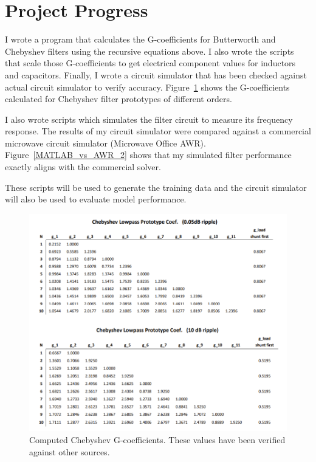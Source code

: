 \documentclass[10pt,conference]{IEEEtran}
\begin{document}
\section{Project Progress}

I wrote a program that calculates the G-coefficients for Butterworth and Chebyshev filters using the recursive equations above. I also wrote the scripts that scale those G-coefficients to get electrical component values for inductors and capacitors. Finally, I wrote a circuit simulator that has been checked against actual circuit simulator to verify accuracy. Figure~\ref{Chebyshev_G_coefs} shows the G-coefficients calculated for Chebyshev filter prototypes of different orders.


I also wrote scripts which simulates the filter circuit to measure its frequency response. The results of my circuit simulator were compared against a commercial microwave circuit simulator (Microwave Office AWR). Figure~\ref{MATLAB_vs_AWR_2} shows that my simulated filter performance exactly aligns with the commercial solver.

These scripts will be used to generate the training data and the circuit simulator will also be used to evaluate model performance.



\begin{figure}
	\centering
	\includegraphics[width=0.9\linewidth]{Figures/Chebyshev_G_coefs.png}
	\caption{Computed Chebyshev G-coefficients. These values have been verified against other sources.}
	\label{Chebyshev_G_coefs}
\end{figure}
\end{document}

